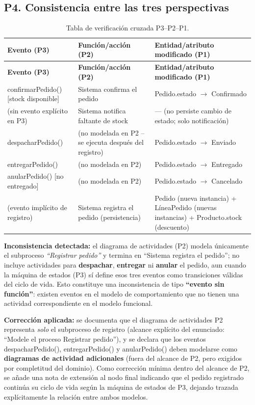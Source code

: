 \documentclass[11pt]{article}
\begin{document}
\subsection*{P4. Consistencia entre las tres perspectivas}

\begin{longtable}{p{4.3cm}p{4.3cm}p{5.3cm}}
\caption{Tabla de verificación cruzada P3--P2--P1.}\\
\toprule
\textbf{Evento (P3)} & \textbf{Función/acción (P2)} & \textbf{Entidad/atributo modificado (P1)} \\
\midrule
\endfirsthead
\toprule
\textbf{Evento (P3)} & \textbf{Función/acción (P2)} & \textbf{Entidad/atributo modificado (P1)} \\
\midrule
\endhead
confirmarPedido() [stock disponible] & Sistema confirma el pedido & Pedido.estado $\rightarrow$
Confirmado \\
(sin evento explícito en P3) & Sistema notifica faltante de stock & --- (no persiste cambio de estado;
solo notificación) \\
despacharPedido() & (no modelada en P2 -- se ejecuta después del registro) & Pedido.estado
$\rightarrow$ Enviado \\
entregarPedido() & (no modelada en P2) & Pedido.estado $\rightarrow$ Entregado \\
anularPedido() [no entregado] & (no modelada en P2) & Pedido.estado $\rightarrow$ Cancelado \\
(evento implícito de registro) & Sistema registra el pedido (persistencia) & Pedido (nueva instancia) +
LíneaPedido (nuevas instancias) + Producto.stock (descuento) \\
\bottomrule
\end{longtable}

\textbf{Inconsistencia detectada:} el diagrama de actividades (P2) modela únicamente el subproceso
\textit{``Registrar pedido''} y termina en ``Sistema registra el pedido''; no incluye actividades para
\textbf{despachar}, \textbf{entregar} ni \textbf{anular} el pedido, aun cuando la máquina de estados (P3)
sí define esos tres eventos como transiciones válidas del ciclo de vida. Esto constituye una
inconsistencia de tipo \textbf{``evento sin función''}: existen eventos en el modelo de comportamiento que
no tienen una actividad correspondiente en el modelo funcional.

\textbf{Corrección aplicada:} se documenta que el diagrama de actividades P2 representa \textit{solo} el
subproceso de registro (alcance explícito del enunciado: ``Modele el proceso Registrar pedido''), y se
declara que los eventos despacharPedido(), entregarPedido() y anularPedido() deben modelarse como
\textbf{diagramas de actividad adicionales} (fuera del alcance de P2, pero exigidos por completitud del
dominio). Como corrección mínima dentro del alcance de P2, se añade una nota de extensión al nodo final
indicando que el pedido registrado continúa su ciclo de vida según la máquina de estados de P3, dejando
trazada explícitamente la relación entre ambos modelos.
\end{document}
